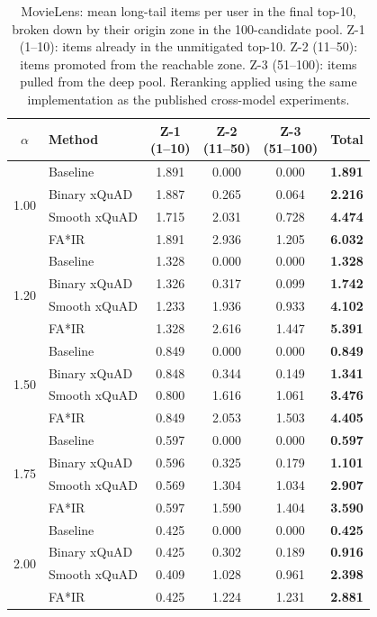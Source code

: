 \begin{table}[htbp]
\centering
\caption{MovieLens: mean long-tail items per user in the final top-10, broken down by their origin zone in the 100-candidate pool. Z-1 (1--10): items already in the unmitigated top-10. Z-2 (11--50): items promoted from the reachable zone. Z-3 (51--100): items pulled from the deep pool. Reranking applied using the same implementation as the published cross-model experiments.}
\label{tab:zone_migration_ml}
\begin{tabular}{clcccc}
\toprule
$\alpha$ & Method & \makecell{Z-1\\(1--10)} & \makecell{Z-2\\(11--50)} & \makecell{Z-3\\(51--100)} & Total \\
\midrule
\multirow{4}{*}{1.00}
 & Baseline & 1.891 & 0.000 & 0.000 & \textbf{1.891} \\
 \rowcolor{gray!6} & Binary xQuAD & 1.887 & 0.265 & 0.064 & \textbf{2.216} \\
 & Smooth xQuAD & 1.715 & 2.031 & 0.728 & \textbf{4.474} \\
 \rowcolor{gray!6} & FA*IR & 1.891 & 2.936 & 1.205 & \textbf{6.032} \\
\midrule
\multirow{4}{*}{1.20}
 & Baseline & 1.328 & 0.000 & 0.000 & \textbf{1.328} \\
 \rowcolor{gray!6} & Binary xQuAD & 1.326 & 0.317 & 0.099 & \textbf{1.742} \\
 & Smooth xQuAD & 1.233 & 1.936 & 0.933 & \textbf{4.102} \\
 \rowcolor{gray!6} & FA*IR & 1.328 & 2.616 & 1.447 & \textbf{5.391} \\
\midrule
\multirow{4}{*}{1.50}
 & Baseline & 0.849 & 0.000 & 0.000 & \textbf{0.849} \\
 \rowcolor{gray!6} & Binary xQuAD & 0.848 & 0.344 & 0.149 & \textbf{1.341} \\
 & Smooth xQuAD & 0.800 & 1.616 & 1.061 & \textbf{3.476} \\
 \rowcolor{gray!6} & FA*IR & 0.849 & 2.053 & 1.503 & \textbf{4.405} \\
\midrule
\multirow{4}{*}{1.75}
 & Baseline & 0.597 & 0.000 & 0.000 & \textbf{0.597} \\
 \rowcolor{gray!6} & Binary xQuAD & 0.596 & 0.325 & 0.179 & \textbf{1.101} \\
 & Smooth xQuAD & 0.569 & 1.304 & 1.034 & \textbf{2.907} \\
 \rowcolor{gray!6} & FA*IR & 0.597 & 1.590 & 1.404 & \textbf{3.590} \\
\midrule
\multirow{4}{*}{2.00}
 & Baseline & 0.425 & 0.000 & 0.000 & \textbf{0.425} \\
 \rowcolor{gray!6} & Binary xQuAD & 0.425 & 0.302 & 0.189 & \textbf{0.916} \\
 & Smooth xQuAD & 0.409 & 1.028 & 0.961 & \textbf{2.398} \\
 \rowcolor{gray!6} & FA*IR & 0.425 & 1.224 & 1.231 & \textbf{2.881} \\
\bottomrule
\end{tabular}
\end{table}